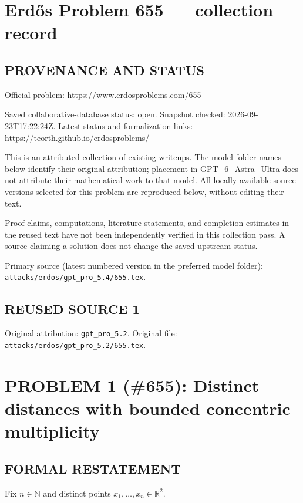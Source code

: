 \section*{Erd\H{o}s Problem 655 --- collection record}

\subsection*{PROVENANCE AND STATUS}
Official problem: https://www.erdosproblems.com/655

Saved collaborative-database status: open.
Snapshot checked: 2026-09-23T17:22:24Z.
Latest status and formalization links: https://teorth.github.io/erdosproblems/

This is an attributed collection of existing writeups. The model-folder names below identify their original attribution; placement in GPT\_6\_Astra\_Ultra does not attribute their mathematical work to that model. All locally available source versions selected for this problem are reproduced below, without editing their text.

Proof claims, computations, literature statements, and completion estimates in the reused text have not been independently verified in this collection pass. A source claiming a solution does not change the saved upstream status.

Primary source (latest numbered version in the preferred model folder): \texttt{attacks/erdos/gpt\_pro\_5.4/655.tex}.

\subsection*{REUSED SOURCE 1}
Original attribution: \texttt{gpt\_pro\_5.2}.
Original file: \texttt{attacks/erdos/gpt\_pro\_5.2/655.tex}.

\section*{PROBLEM 1 (\#655): Distinct distances with bounded concentric multiplicity}

\subsection*{FORMAL RESTATEMENT}
Fix $n\in\mathbb{N}$ and distinct points $x_1,\dots,x_n\in\mathbb{R}^2$.

